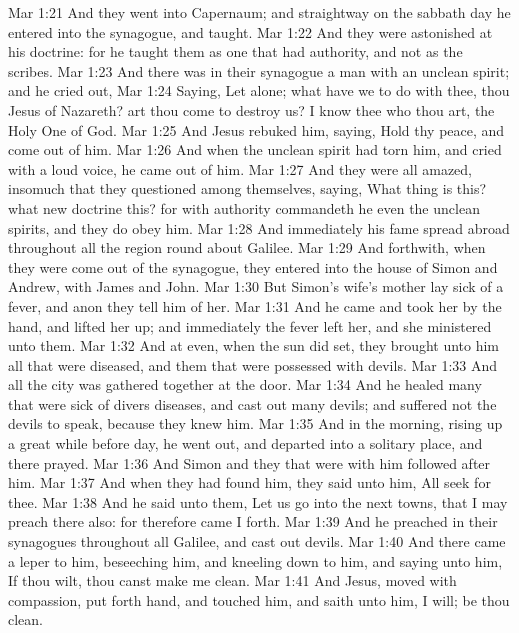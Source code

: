 \vs Mar 1:21 And they went into Capernaum; and straightway on the sabbath day he entered into the synagogue, and taught.
\vs Mar 1:22 And they were astonished at his doctrine: for he taught them as one that had authority, and not as the scribes.
\vs Mar 1:23 And there was in their synagogue a man with an unclean spirit; and he cried out,
\vs Mar 1:24 Saying, Let  alone; what have we to do with thee, thou Jesus of Nazareth? art thou come to destroy us? I know thee who thou art, the Holy One of God.
\vs Mar 1:25 And Jesus rebuked him, saying, Hold thy peace, and come out of him.
\vs Mar 1:26 And when the unclean spirit had torn him, and cried with a loud voice, he came out of him.
\vs Mar 1:27 And they were all amazed, insomuch that they questioned among themselves, saying, What thing is this? what new doctrine  this? for with authority commandeth he even the unclean spirits, and they do obey him.
\vs Mar 1:28 And immediately his fame spread abroad throughout all the region round about Galilee.
\vs Mar 1:29 And forthwith, when they were come out of the synagogue, they entered into the house of Simon and Andrew, with James and John.
\vs Mar 1:30 But Simon's wife's mother lay sick of a fever, and anon they tell him of her.
\vs Mar 1:31 And he came and took her by the hand, and lifted her up; and immediately the fever left her, and she ministered unto them.
\vs Mar 1:32 And at even, when the sun did set, they brought unto him all that were diseased, and them that were possessed with devils.
\vs Mar 1:33 And all the city was gathered together at the door.
\vs Mar 1:34 And he healed many that were sick of divers diseases, and cast out many devils; and suffered not the devils to speak, because they knew him.
\vs Mar 1:35 And in the morning, rising up a great while before day, he went out, and departed into a solitary place, and there prayed.
\vs Mar 1:36 And Simon and they that were with him followed after him.
\vs Mar 1:37 And when they had found him, they said unto him, All  seek for thee.
\vs Mar 1:38 And he said unto them, Let us go into the next towns, that I may preach there also: for therefore came I forth.
\vs Mar 1:39 And he preached in their synagogues throughout all Galilee, and cast out devils.
\vs Mar 1:40 And there came a leper to him, beseeching him, and kneeling down to him, and saying unto him, If thou wilt, thou canst make me clean.
\vs Mar 1:41 And Jesus, moved with compassion, put forth  hand, and touched him, and saith unto him, I will; be thou clean.
